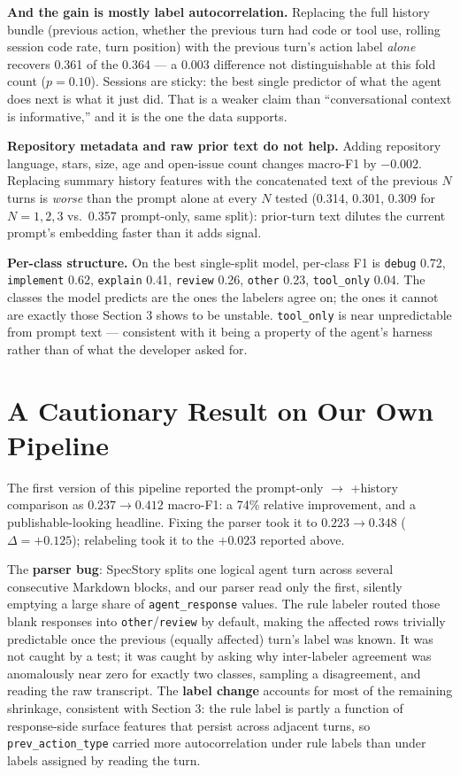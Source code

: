 \documentclass[10pt]{article}
\begin{document}
\textbf{And the gain is mostly label autocorrelation.} Replacing the full history
bundle (previous action, whether the previous turn had code or tool use, rolling
session code rate, turn position) with the previous turn's action label
\emph{alone} recovers 0.361 of the 0.364 --- a 0.003 difference not
distinguishable at this fold count ($p = 0.10$). Sessions are sticky: the best
single predictor of what the agent does next is what it just did. That is a
weaker claim than ``conversational context is informative,'' and it is the one
the data supports.

\textbf{Repository metadata and raw prior text do not help.} Adding repository
language, stars, size, age and open-issue count changes macro-F1 by $-0.002$.
Replacing summary history features with the concatenated text of the previous $N$
turns is \emph{worse} than the prompt alone at every $N$ tested (0.314, 0.301,
0.309 for $N = 1,2,3$ vs.\ 0.357 prompt-only, same split): prior-turn text
dilutes the current prompt's embedding faster than it adds signal.

\textbf{Per-class structure.} On the best single-split model, per-class F1 is
\texttt{debug} 0.72, \texttt{implement} 0.62, \texttt{explain} 0.41,
\texttt{review} 0.26, \texttt{other} 0.23, \texttt{tool\_only} 0.04. The classes
the model predicts are the ones the labelers agree on; the ones it cannot are
exactly those Section 3 shows to be unstable. \texttt{tool\_only} is near
unpredictable from prompt text --- consistent with it being a property of the
agent's harness rather than of what the developer asked for.

\section{A Cautionary Result on Our Own Pipeline}

The first version of this pipeline reported the prompt-only $\rightarrow$
+history comparison as $0.237 \rightarrow 0.412$ macro-F1: a 74\% relative
improvement, and a publishable-looking headline. Fixing the parser took it to
$0.223 \rightarrow 0.348$ ($\Delta = +0.125$); relabeling took it to the
$+0.023$ reported above.

The \textbf{parser bug}: SpecStory splits one logical agent turn across several
consecutive Markdown blocks, and our parser read only the first, silently
emptying a large share of \texttt{agent\_response} values. The rule labeler
routed those blank responses into \texttt{other}/\texttt{review} by default,
making the affected rows trivially predictable once the previous (equally
affected) turn's label was known. It was not caught by a test; it was caught by
asking why inter-labeler agreement was anomalously near zero for exactly two
classes, sampling a disagreement, and reading the raw transcript. The
\textbf{label change} accounts for most of the remaining shrinkage, consistent
with Section 3: the rule label is partly a function of response-side surface
features that persist across adjacent turns, so \texttt{prev\_action\_type}
carried more autocorrelation under rule labels than under labels assigned by
reading the turn.
\end{document}
